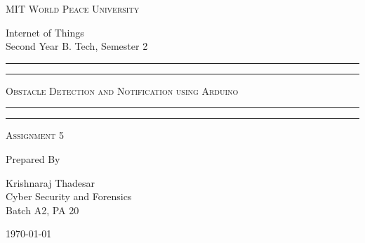 \documentclass[11pt]{article}
\begin{document}
\begin{titlepage}
	\centering


	\huge\textsc{
		MIT World Peace University
	}\\

	\vspace{0.75\baselineskip} %

	\LARGE{
		Internet of Things\\
		Second Year B. Tech, Semester 2
	}

	\vfill %


	\rule{\textwidth}{1.6pt}\vspace*{-\baselineskip}\vspace*{2pt}
	\rule{\textwidth}{0.6pt}
	\vspace{0.75\baselineskip} %



	\huge{\textsc{
			Obstacle Detection and Notification using Arduino
		}} \\



	\vspace{0.5\baselineskip} %
	\rule{\textwidth}{0.6pt}\vspace*{-\baselineskip}\vspace*{2.8pt}
	\rule{\textwidth}{1.6pt}

	\vspace{1\baselineskip} %


	\LARGE\textsc{
		Assignment 5
	} %
	\vfill


	Prepared By
	\vspace{0.5\baselineskip} %

	\Large{
		Krishnaraj Thadesar \\
		Cyber Security and Forensics\\
		Batch A2, PA 20
	}


	\vspace{0.5\baselineskip} %
	\today

\end{titlepage}
\end{document}
